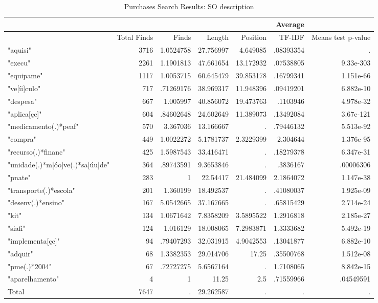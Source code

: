 \begin{table}[htbp]
\caption{\label{taba2} Purchases Search Results: SO description}\centering\medskip
\begin{tabular}{|l|r|r|r|r|r|r|}\hline
  & & \multicolumn{4}{r}{Average} & & \\ \hline
  & Total Finds & Finds  & Length & Position & TF-IDF  & Means test p-value  \\ \hline
  "aquisi" & 3716 & 1.0524758 & 27.756997 & 4.649085 & .08393354 & . \\ \hline
  "execu" & 2261 & 1.1901813 & 47.661654 & 13.172932 & .07538805 & 9.33e-303 \\ \hline
  "equipame" & 1117 & 1.0053715 & 60.645479 & 39.853178 & .16799341 & 1.151e-66 \\ \hline
  "ve[íi]culo" & 717 & .71269176 & 38.969317 & 11.948396 & .09419201 & 6.882e-10 \\ \hline
  "despesa" & 667 & 1.005997 & 40.856072 & 19.473763 & .1103946 & 4.978e-32 \\ \hline
  "aplica[çc]" & 604 & .84602648 & 24.602649 & 11.389073 & .13492084 & 3.67e-121 \\ \hline
  "medicamento(.)*peaf" & 570 & 3.367036 & 13.166667 & . & .79446132 & 5.513e-92 \\ \hline
  "compra" & 449 & 1.0022272 & 5.1781737 & 2.3229399 & 2.304644 & 1.376e-95 \\ \hline
  "recurso(.)*financ" & 425 & 1.5987543 & 33.416471 & . & .18279378 & 6.347e-31 \\ \hline
  "unidade(.)*m[óo]ve(.)*sa[úu]de" & 364 & .89743591 & 9.3653846 & . & .3836167 & .00006306 \\ \hline
  "pnate" & 283 & 1 & 22.54417 & 21.484099 & 2.1864072 & 1.147e-38 \\ \hline
  "transporte(.)*escola" & 201 & 1.360199 & 18.492537 & . & .41080037 & 1.925e-09 \\ \hline
  "desenv(.)*ensino" & 167 & 5.0542665 & 37.167665 & . & .65815429 & 2.714e-24 \\ \hline
  "kit" & 134 & 1.0671642 & 7.8358209 & 3.5895522 & 1.2916818 & 2.185e-27 \\ \hline
  "siafi" & 124 & 1.016129 & 18.008065 & 7.2983871 & 1.3333682 & 5.492e-19 \\ \hline
  "implementa[çc]" & 94 & .79407293 & 32.031915 & 4.9042553 & .13041877 & 6.882e-10 \\ \hline
  "adquir" & 68 & 1.3382353 & 29.014706 & 17.25 & .35500768 & 1.512e-08 \\ \hline
  "pme(.)*2004" & 67 & .72727275 & 5.6567164 & . & 1.7108065 & 8.842e-15 \\ \hline
  "aparelhamento" & 4 & 1 & 11.25 & 2.5 & .71559966 & .04549591 \\ \hline
  Total  & 7647 & . & 29.262587 & . & . & . \\ \hline
  \end{tabular}
\end{table}